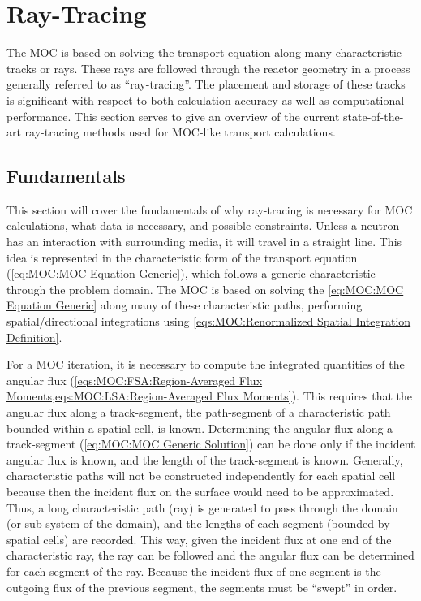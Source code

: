 {    \section{Ray-Tracing}{\label{sec:MOC:Ray-Tracing}
      The \acf{MOC} \cite{Askew1972} is based on solving the transport equation along many characteristic tracks or rays.
      These rays are followed through the reactor geometry in a process generally referred to as ``ray-tracing''.
      The placement and storage of these tracks is significant with respect to both calculation accuracy as well as computational performance.
      This section serves to give an overview of the current state-of-the-art ray-tracing methods used for \ac{MOC}-like transport calculations.

      \subsection{Fundamentals}{\label{ssec:MOC:RT:Fundamentals}
        This section will cover the fundamentals of why ray-tracing is necessary for \ac{MOC} calculations, what data is necessary, and possible constraints.
        Unless a neutron has an interaction with surrounding media, it will travel in a straight line.
        This idea is represented in the characteristic form of the transport equation (\cref{eq:MOC:MOC Equation Generic}), which follows a generic characteristic through the problem domain.
        The \ac{MOC} is based on solving the \cref{eq:MOC:MOC Equation Generic} along many of these characteristic paths, performing spatial/directional integrations using \cref{eqs:MOC:Renormalized Spatial Integration Definition}.

        For a \ac{MOC} iteration, it is necessary to compute the integrated quantities of the angular flux (\cref{eqs:MOC:FSA:Region-Averaged Flux Moments,eqs:MOC:LSA:Region-Averaged Flux Moments}).
        This requires that the angular flux along a track-segment, the path-segment of a characteristic path bounded within a spatial cell, is known.
        Determining the angular flux along a track-segment (\cref{eq:MOC:MOC Generic Solution}) can be done only if the incident angular flux is known, and the length of the track-segment is known.
        Generally, characteristic paths will not be constructed independently for each spatial cell because then the incident flux on the surface would need to be approximated.
        Thus, a long characteristic path (ray) is generated to pass through the domain (or sub-system of the domain), and the lengths of each segment (bounded by spatial cells) are recorded.
        This way, given the incident flux at one end of the characteristic ray, the ray can be followed and the angular flux can be determined for each segment of the ray.
        Because the incident flux of one segment is the outgoing flux of the previous segment, the segments must be ``swept'' in order.
      }

}}

